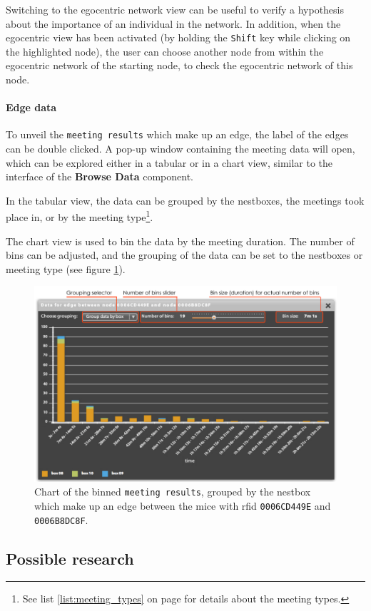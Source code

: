 Switching to the egocentric network view can be useful to verify a hypothesis about the importance of an individual in the network. In addition, when the egocentric view has been activated (by holding the \lstinline|Shift| key while clicking on the highlighted node), the user can choose another node from within the egocentric network of the starting node, to check the egocentric network of this node.

\paragraph{Edge data}

To unveil the \lstinline|meeting results| which make up an edge, the label of the edges can be double clicked. A pop-up window containing the meeting data will open, which can be explored either in a tabular or in a chart view, similar to the interface of the \textbf{Browse Data} component.

In the tabular view, the data can be grouped by the nestboxes, the meetings took place in, or by the meeting type\footnote{See list \ref{list:meeting_types} on page \pageref{list:meeting_types} for details about the meeting types.}.

The chart view is used to bin the data by the meeting duration. The number of bins can be adjusted, and the grouping of the data can be set to the nestboxes or meeting type (see figure \ref{fig:edge_data_panel_chart}).

\begin{figure}[!htpb]
\begin{center}
  \includegraphics[width=\textwidth]{assets/pdf/edge_data_panel_chart.pdf}
  \caption[Edge data chart]{Chart of the binned \lstinline|meeting results|, grouped by the nestbox which make up an edge between the mice with rfid \lstinline|0006CD449E| and \lstinline|0006B8DC8F|.}
  \label{fig:edge_data_panel_chart}
\end{center}
\end{figure}   

\subsection{Possible research}
\label{subsec:graph_research}
